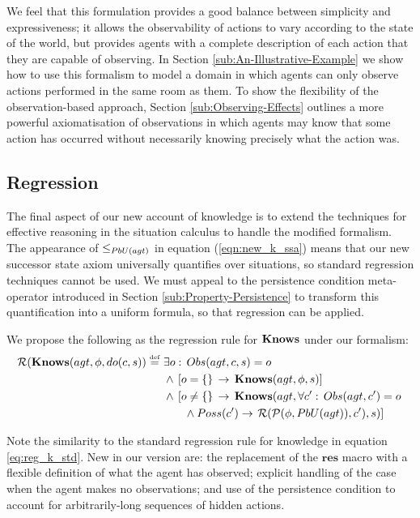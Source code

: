 We feel that this formulation provides a good balance between simplicity
and expressiveness; it allows the observability of actions to vary
according to the state of the world, but provides agents with a complete
description of each action that they are capable of observing. In
Section \ref{sub:An-Illustrative-Example} we show how to use this
formalism to model a domain in which agents can only observe actions
performed in the same room as them. To show the flexibility of the
observation-based approach, Section \ref{sub:Observing-Effects} outlines
a more powerful axiomatisation of observations in which agents may
know that some action has occurred without necessarily knowing precisely
what the action was.


\subsection{Regression}

The final aspect of our new account of knowledge is to extend the
techniques for effective reasoning in the situation calculus to handle
the modified formalism. The appearance of $\leq_{PbU(agt)}$ in equation
(\ref{eqn:new_k_ssa}) means that our new successor state axiom universally
quantifies over situations, so standard regression techniques cannot
be used. We must appeal to the persistence condition meta-operator
introduced in Section  \ref{sub:Property-Persistence} to transform
this quantification into a uniform formula, so that regression can
be applied.

We propose the following as the regression rule for $\mathbf{Knows}$ under
our formalism:\begin{align}
\mathcal{R}(\mathbf{Knows}(agt,\phi,do(c,s))\stackrel{\mbox{\tiny def}}{=}\,\, & \exists o:\, Obs(agt,c,s)=o\nonumber \\
 & \wedge\,\left[o=\{\}\,\rightarrow\,\mathbf{Knows}(agt,\phi,s)\right]\nonumber \\
 & \wedge\,\left[o\neq\{\}\,\rightarrow\,\mathbf{Knows}(agt,\forall c':\, Obs(agt,c')=o\right.\nonumber \\
 & \,\,\,\,\,\,\,\,\,\,\,\wedge Poss(c')\rightarrow\left.\mathcal{R}(\mathcal{P}(\phi,PbU(agt)),c'),s)\right]\label{eqn:R_do_c_s}\end{align}
 

Note the similarity to the standard regression rule for knowledge
in equation \eqref{eq:reg_k_std}. New in our version are: the replacement
of the $\mathbf{res}$ macro with a flexible definition of what the
agent has observed; explicit handling of the case when the agent makes
no observations; and use of the persistence condition to account for
arbitrarily-long sequences of hidden actions.

